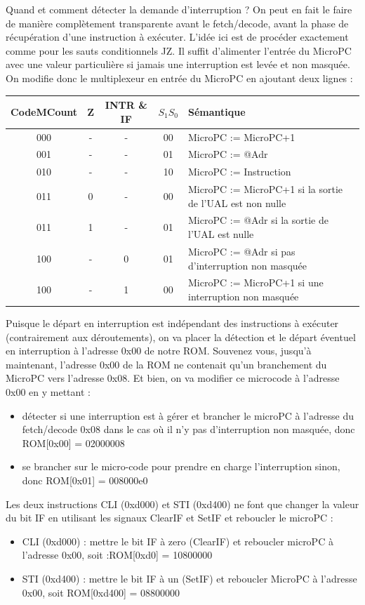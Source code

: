 Quand et comment détecter la demande d'interruption ? On peut en fait le faire de manière complètement transparente avant le fetch/decode, avant la phase de récupération d'une instruction à exécuter. L'idée ici est de procéder exactement comme pour les sauts conditionnels JZ. Il suffit d'alimenter l'entrée du MicroPC avec une valeur particulière si jamais une interruption est levée et non masquée. On modifie donc le multiplexeur en entrée du MicroPC en ajoutant deux lignes :

\begin{tabular}{ccc|cl}
CodeMCount & Z & INTR \& IF & $S_1S_0$ & Sémantique\\
\hline
000 &  - & - & 00 & MicroPC := MicroPC+1\\
001 &  - & - & 01 & MicroPC := @Adr\\
010 &  - & - & 10 & MicroPC := Instruction\\
011 &  0 & - & 00 & MicroPC := MicroPC+1  si la sortie de l'UAL est non nulle\\
011 &  1 & - & 01 & MicroPC := @Adr si la sortie de l'UAL est nulle\\
100 &  - & 0 & 01 & MicroPC := @Adr si pas d'interruption non masquée\\
100 &  - & 1 & 00 & MicroPC := MicroPC+1 si une interruption non masquée
\end{tabular}

 Puisque le départ en interruption est indépendant des instructions à exécuter (contrairement aux déroutements), on va placer la détection et le départ éventuel en interruption à l'adresse 0x00 de notre ROM. Souvenez vous, jusqu'à maintenant, l'adresse 0x00 de la ROM ne contenait qu'un branchement du MicroPC vers l'adresse 0x08. Et bien, on va modifier ce microcode à l'adresse 0x00 en y mettant :
\begin{itemize}
\item détecter si une interruption est à gérer et brancher le microPC à l'adresse du fetch/decode 0x08 dans le cas o{\`u} il n'y pas d'interruption non masquée, donc ROM[0x00] = 02000008
\item se brancher sur le micro-code pour prendre en charge l'interruption sinon, donc ROM[0x01] = 008000e0
\end{itemize}
 
Les deux instructions CLI (0xd000) et STI (0xd400) ne font que changer la valeur du bit IF en utilisant les signaux ClearIF et SetIF et reboucler le microPC :
\begin{itemize}
\item CLI (0xd000) : mettre le bit IF à zero (ClearIF) et reboucler microPC à l'adresse 0x00, soit :ROM[0xd0] = 10800000
\item STI (0xd400) : mettre le bit IF à un (SetIF) et reboucler MicroPC à l'adresse 0x00, soit ROM[0xd400] = 08800000
\end{itemize}


